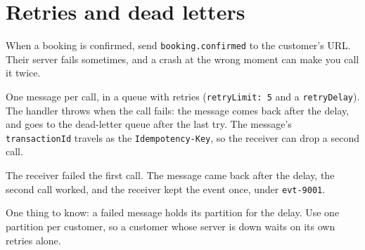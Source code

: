 %

\section{Retries and dead letters}

When a booking is confirmed, send \texttt{booking.confirmed} to the customer's URL. Their server
fails sometimes, and a crash at the wrong moment can make you call it twice.

One message per call, in a queue with retries (\texttt{retryLimit: 5} and a \texttt{retryDelay}).
The handler throws when the call fails: the message comes back after the delay, and goes to the
dead-letter queue after the last try. The message's \texttt{transactionId} travels as the
\texttt{Idempotency-Key}, so the receiver can drop a second call.



The receiver failed the first call. The message came back after the delay, the second call worked,
and the receiver kept the event once, under \texttt{evt-9001}.


One thing to know: a failed message holds its partition for the delay. Use one partition per
customer, so a customer whose server is down waits on its own retries alone.
